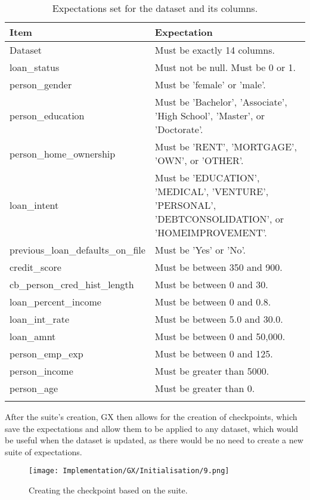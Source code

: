 \begin{longtable}{ | p{} | p{} |}
    \hline
    \cellcolor{blue!25}Item & \cellcolor{blue!25}Expectation\\
    \hline
    Dataset & Must be exactly 14 columns. \\
    \hline
    loan\_status & Must not be null. \newline Must be 0 or 1. \\
    \hline 
    person\_gender & Must be 'female' or 'male'. \\
    \hline 
    person\_education & Must be 'Bachelor', 'Associate', 'High School', 'Master', or 'Doctorate'. \\
    \hline
    person\_home\_ownership & Must be 'RENT', 'MORTGAGE', 'OWN', or 'OTHER'.\\
    \hline 
    loan\_intent & Must be 'EDUCATION', 'MEDICAL', 'VENTURE', 'PERSONAL', 'DEBTCONSOLIDATION', or 'HOMEIMPROVEMENT'.\\
    \hline 
    previous\_loan\_defaults\_on\_file & Must be 'Yes' or 'No'. \\
    \hline
    credit\_score & Must be between 350 and 900. \\
    \hline
    cb\_person\_cred\_hist\_length & Must be between 0 and 30. \\
    \hline
    loan\_percent\_income & Must be between 0 and 0.8. \\
    \hline
    loan\_int\_rate & Must be between 5.0 and 30.0. \\
    \hline
    loan\_amnt & Must be between 0 and 50,000. \\
    \hline 
    person\_emp\_exp & Must be between 0 and 125. \\
    \hline 
    person\_income & Must be greater than 5000. \\
    \hline 
    person\_age & Must be greater than 0. \\
    \hline
\caption{Expectations set for the dataset and its columns.}\label{tab:Expectations}
\end{longtable}

\para After the suite's creation, GX then allows for the creation of checkpoints, which save the expectations and allow
them to be applied to any dataset, which would be useful when the dataset is updated, as there would be no need 
to create a new suite of expectations.

\begin{figure}[H]
    \centering
    \texttt{[image: Implementation/GX/Initialisation/9.png]}
    \caption{Creating the checkpoint based on the suite.}
    \label{fig:GXCheckpoint1}
\end{figure}

